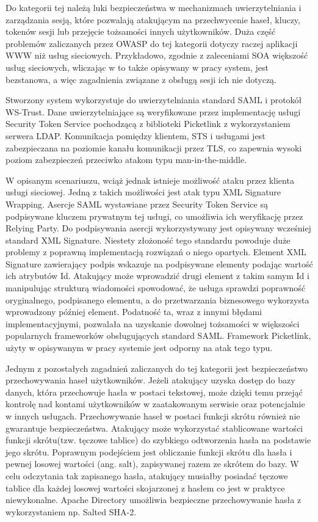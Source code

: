 
	Do kategorii tej należą luki bezpieczeństwa w mechanizmach uwierzytelniania i zarządzania sesją, które pozwalają atakującym na przechwycenie haseł, kluczy, tokenów sesji lub przejęcie tożsamości innych użytkowników.
	Duża część problemów zaliczanych przez OWASP do tej kategorii dotyczy raczej aplikacji WWW niż usług sieciowych. Przykładowo, zgodnie z zaleceniami SOA większość usług sieciowych, wliczając w to także opisywany w pracy system, jest bezstanowa, a więc zagadnienia związane z obsługą sesji ich nie dotyczą. 

	Stworzony system wykorzystuje do uwierzytelniania standard SAML i protokół WS-Trust. Dane uwierzytelniające są weryfikowane przez implementację usługi Security Token Service pochodzącą z biblioteki Picketlink z wykorzystaniem serwera LDAP. Komunikacja pomiędzy klientem, STS i usługami jest zabezpieczana na poziomie kanału komunikacji przez TLS, co zapewnia wysoki poziom zabezpieczeń przeciwko atakom typu man-in-the-middle.

	W opisanym scenariuszu, wciąż jednak istnieje możliwość ataku przez klienta usługi sieciowej. Jedną z takich możliwości jest atak typu XML Signature Wrapping. Asercje SAML wystawiane przez Security Token Service są podpisywane kluczem prywatnym tej usługi, co umożliwia ich weryfikację przez Relying Party. Do podpisywania asercji wykorzystywany jest opisywany wcześniej standard XML Signature. Niestety złożoność tego standardu powoduje duże problemy z poprawną implementacją rozwiązań o niego opartych. Element XML Signature zawierający podpis wskazuje na podpisywane elementy podając wartość ich atrybutów Id. Atakujący może wprowadzić drugi element z takim samym Id i manipulując strukturą wiadomości spowodować, że usługa sprawdzi poprawność oryginalnego, podpisanego elementu, a do przetwarzania biznesowego wykorzysta wprowadzony później element. Podatność ta, wraz z innymi błędami implementacyjnymi, pozwalała na uzyskanie dowolnej tożsamości w większości popularnych frameworków obsługujących standard SAML\cite{Somorovsky}. Framework Picketlink, użyty w opisywanym w pracy systemie jest odporny na atak tego typu. 

	Jednym z pozostałych zagadnień zaliczanych do tej kategorii jest bezpieczeństwo przechowywania haseł użytkowników. Jeżeli atakujący uzyska dostęp do bazy danych, która przechowuje hasła w postaci tekstowej, może dzięki temu przejąć kontrolę nad kontami użytkowników w zaatakowanym serwisie oraz potencjalnie w innych usługach.  Przechowywanie haseł w postaci funkcji skrótu również nie gwarantuje bezpieczeństwa. Atakujący może wykorzystać stablicowane wartości funkcji skrótu(tzw. tęczowe tablice) do szybkiego odtworzenia hasła na podstawie jego skrótu. Poprawnym podejściem jest obliczanie funkcji skrótu dla hasła i pewnej losowej wartości (ang. salt), zapisywanej razem ze skrótem do bazy. W celu odczytania tak zapisanego hasła, atakujący musiałby posiadać tęczowe tablice dla każdej losowej wartości skojarzonej z hasłem co jest w praktyce niewykonalne. Apache Directory umożliwia bezpieczne przechowywanie hasła z wykorzystaniem np. Salted SHA-2.
